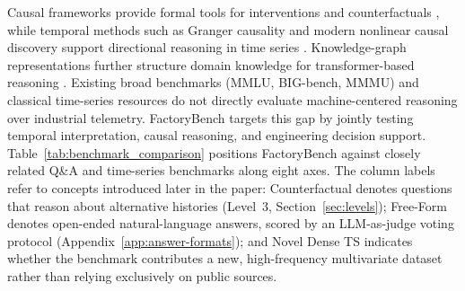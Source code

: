 \documentclass{article}
\begin{document}
Causal frameworks provide formal tools for interventions and counterfactuals \cite{pearl2009causality,peters2017elements,rubin1974causal}, while temporal methods such as Granger causality and modern nonlinear causal discovery support directional reasoning in time series \cite{granger1969causal,runge2019causal}. Knowledge-graph representations further structure domain knowledge for transformer-based reasoning \cite{petersen2026structuralinductivebiashelps}. Existing broad benchmarks (MMLU, BIG-bench, MMMU) \cite{hendrycks2021mmlu,srivastava2023bigbench,yue2024mmmu} and classical time-series resources \cite{laptev2015generic,dau2019ucr,wen2022transformers} do not directly evaluate machine-centered reasoning over industrial telemetry. FactoryBench targets this gap by jointly testing temporal interpretation, causal reasoning, and engineering decision support. Table~\ref{tab:benchmark_comparison} positions FactoryBench against closely related Q\&A and time-series benchmarks along eight axes. The column labels refer to concepts introduced later in the paper: Counterfactual denotes questions that reason about alternative histories (Level~3, Section~\ref{sec:levels}); Free-Form denotes open-ended natural-language answers, scored by an LLM-as-judge voting protocol (Appendix~\ref{app:answer-formats}); and Novel Dense TS indicates whether the benchmark contributes a new, high-frequency multivariate dataset rather than relying exclusively on public sources.
\end{document}
